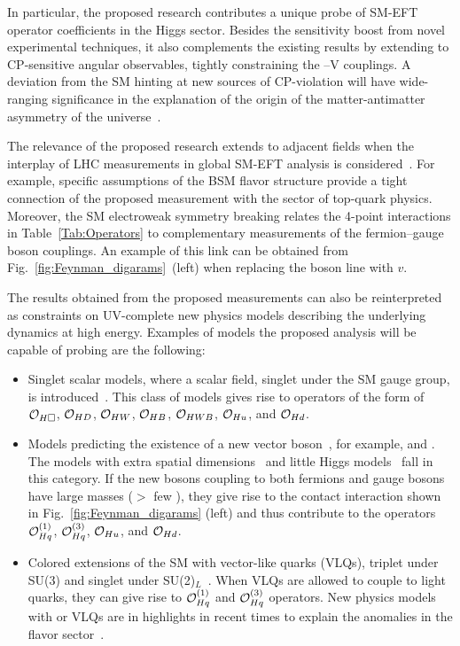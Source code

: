 \documentclass[a4paper,11pt]{article}
\renewcommand{\PV}{{{{V}}}\xspace}
\begin{document}
In particular, the proposed research contributes a unique probe of SM-EFT operator coefficients in the Higgs sector.
Besides the sensitivity boost from novel experimental techniques, it also complements the existing results by extending to CP-sensitive angular observables, tightly constraining the \PH--\PV couplings.
A deviation from the SM hinting at new sources of CP-violation will have wide-ranging significance in the explanation of the origin of the matter-antimatter asymmetry of the universe~\cite{Cohen:1997ac,Damgaard:2015con,Grzadkowski:2018nbc}.

The relevance of the proposed research extends to adjacent fields when the interplay of LHC measurements in global SM-EFT analysis is considered~\cite{Ellis:2018gqa,Ethier:2021bye}.
For example, specific assumptions of the BSM flavor structure provide a tight connection of the proposed measurement with the sector of top-quark physics. 
Moreover, the SM electroweak symmetry breaking relates the 4-point interactions in Table~\ref{Tab:Operators} to complementary measurements of the fermion--gauge boson couplings. 
An example of this link can be obtained from Fig.~\ref{fig:Feynman_digarams}~(left) when replacing the \PH boson line with $v$.

The results obtained from the proposed measurements can also be reinterpreted as constraints on UV-complete new physics models describing the underlying dynamics at high energy.
Examples of models the proposed analysis will be capable of probing are the following:
\begin{itemize}

\item Singlet scalar models, where a scalar field, singlet under the SM gauge group, is introduced~\cite{deBlas:2014mba,Profumo:2014opa}. This class of models gives rise to operators of the form of ${\cal O}_{H\square}$, ${\cal O}_{HD}$, ${\cal O}_{HW}$, ${\cal O}_{HB}$, ${\cal O}_{HWB}$, ${\cal O}_{Hu}$, and ${\cal O}_{Hd}$.

\item Models predicting the existence of a new vector boson~\cite{delAguila:2010mx}, for example, \PZprime and \PWprime. 
The models with extra spatial dimensions~\cite{Burdman:2006gy} and little Higgs models~\cite{PhysRevD.10.275} fall in this category.
If the new bosons coupling to both fermions and gauge bosons have large masses ($>$ few \TeV), they give rise to the contact interaction shown in Fig.~\ref{fig:Feynman_digarams} (left) and thus contribute to the operators  ${\cal O}^{(1)}_{Hq}$, ${\cal O}^{(3)}_{Hq}$, ${\cal O}_{Hu}$, and ${\cal O}_{Hd}$. 

\item Colored extensions of the SM with vector-like quarks (VLQs), triplet under SU(3) and singlet under SU(2)$_L$~\cite{delAguila:2000aa,Dawson:2012di}. 
When VLQs are allowed to couple to light quarks, they can give rise to ${\cal O}^{(1)}_{Hq}$ and ${\cal O}^{(3)}_{Hq}$ operators.
New physics models with \PZprime or VLQs are in highlights in recent times to explain the anomalies in the flavor sector~\cite{Kumar:2018kmr,Bhattacharya:2016mcc,Buttazzo:2017ixm}.%

\end{itemize}
\end{document}
